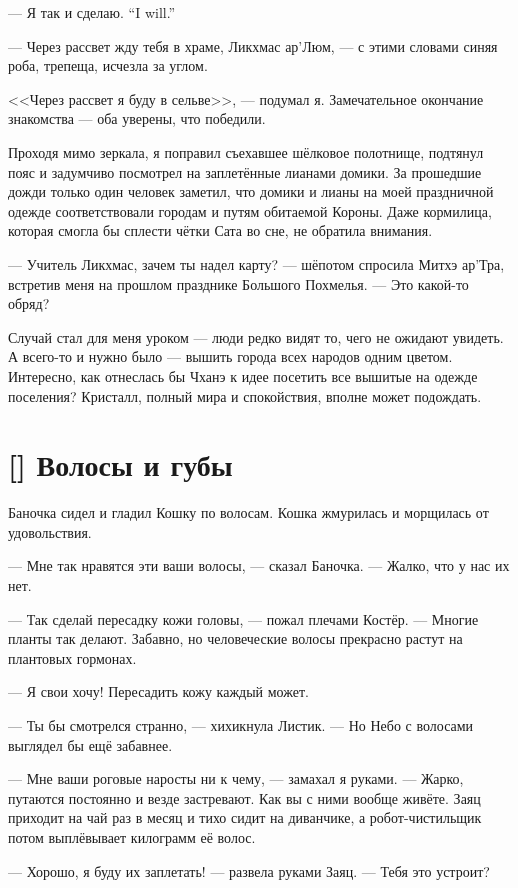 {--- Я так и сделаю.}
{``I will.''}

--- Через рассвет жду тебя в храме, Ликхмас ар'Люм, --- с этими словами синяя роба, трепеща, исчезла за углом.

<<Через рассвет я буду в сельве>>, --- подумал я.
Замечательное окончание знакомства --- оба уверены, что победили.

Проходя мимо зеркала, я поправил съехавшее шёлковое полотнище, подтянул пояс и задумчиво посмотрел на заплетённые лианами домики.
За прошедшие дожди только один человек заметил, что домики и лианы на моей праздничной одежде соответствовали городам и путям обитаемой Короны.
Даже кормилица, которая смогла бы сплести чётки Сата во сне, не обратила внимания.

--- Учитель Ликхмас, зачем ты надел карту? --- шёпотом спросила Митхэ ар'Тра, встретив меня на прошлом празднике Большого Похмелья.
--- Это какой-то обряд?

Случай стал для меня уроком --- люди редко видят то, чего не ожидают увидеть.
А всего-то и нужно было --- вышить города всех народов одним цветом.
Интересно, как отнеслась бы Чханэ к идее посетить все вышитые на одежде поселения?
Кристалл, полный мира и спокойствия, вполне может подождать.

\section{[] Волосы и губы}

\textspace

Баночка сидел и гладил Кошку по волосам.
Кошка жмурилась и морщилась от удовольствия.

--- Мне так нравятся эти ваши волосы, --- сказал Баночка.
--- Жалко, что у нас их нет.

--- Так сделай пересадку кожи головы, --- пожал плечами Костёр.
--- Многие планты так делают.
Забавно, но человеческие волосы прекрасно растут на плантовых гормонах.

--- Я свои хочу!
Пересадить кожу каждый может.

--- Ты бы смотрелся странно, --- хихикнула Листик.
--- Но Небо с волосами выглядел бы ещё забавнее.

--- Мне ваши роговые наросты ни к чему, --- замахал я руками.
--- Жарко, путаются постоянно и везде застревают.
Как вы с ними вообще живёте.
Заяц приходит на чай раз в месяц и тихо сидит на диванчике, а робот-чистильщик потом выплёвывает килограмм её волос.

--- Хорошо, я буду их заплетать! --- развела руками Заяц.
--- Тебя это устроит?

